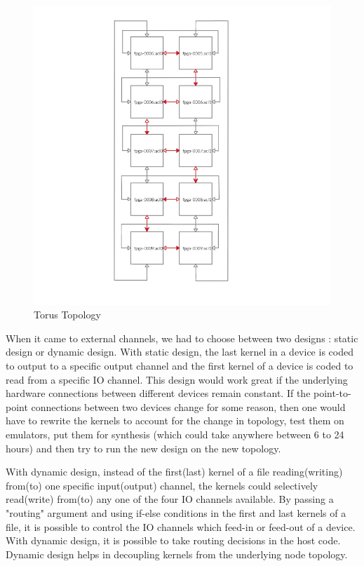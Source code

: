 \begin{figure}[!htb]
  \includegraphics{img/Torus_Topology.PNG}
  \caption{Torus Topology}
  \label{fig:Torus_Topology}
\end{figure}

When it came to external channels, we had to choose between two designs : static design or dynamic design. With static design, the last kernel in a device is coded to output to a specific output channel and  the first kernel of a device is coded to read from a specific IO channel. This design would work great if the underlying hardware connections between different devices remain constant. If the point-to-point connections between two devices change for some reason, then one would have to rewrite the kernels to account for the change in topology, test them on emulators, put them for synthesis (which could take anywhere between 6 to 24 hours) and then try to run the new design on the new topology.




With dynamic design, instead of the first(last) kernel of a file reading(writing) from(to) one specific input(output) channel, the kernels could selectively read(write)  from(to) any one of the four IO channels available. By passing a "routing" argument and using if-else conditions in the first and last kernels of a file, it is possible to control the IO channels which feed-in or feed-out of a device. With dynamic design, it is possible to take routing decisions in the host code. Dynamic design helps in decoupling kernels from the underlying node topology.



